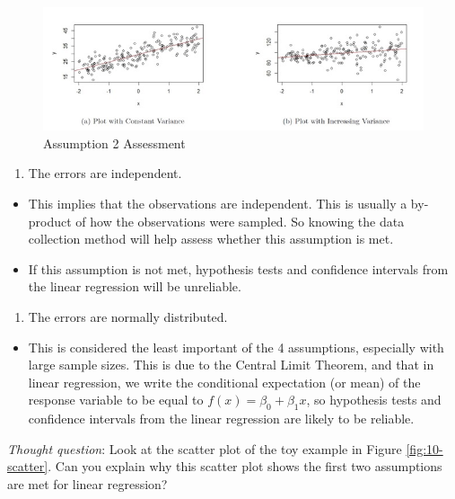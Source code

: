 \documentclass[
]{book}
\providecommand{\tightlist}{%
  \setlength{\itemsep}{0pt}\setlength{\parskip}{0pt}}
\begin{document}
\begin{figure}
\centering
\includegraphics{images/10-ass2.jpg}
\caption{\label{fig:10-ass2}Assumption 2 Assessment}
\end{figure}

\begin{enumerate}
\def\labelenumi{\arabic{enumi}.}
\setcounter{enumi}{2}
\tightlist
\item
  The errors are independent.
\end{enumerate}

\begin{itemize}
\tightlist
\item
  This implies that the observations are independent. This is usually a by-product of how the observations were sampled. So knowing the data collection method will help assess whether this assumption is met.
\item
  If this assumption is not met, hypothesis tests and confidence intervals from the linear regression will be unreliable.
\end{itemize}

\begin{enumerate}
\def\labelenumi{\arabic{enumi}.}
\setcounter{enumi}{3}
\tightlist
\item
  The errors are normally distributed.
\end{enumerate}

\begin{itemize}
\tightlist
\item
  This is considered the least important of the 4 assumptions, especially with large sample sizes. This is due to the Central Limit Theorem, and that in linear regression, we write the conditional expectation (or mean) of the response variable to be equal to \(f(x) = \beta_0 + \beta_1 x\), so hypothesis tests and confidence intervals from the linear regression are likely to be reliable.
\end{itemize}

\emph{Thought question}: Look at the scatter plot of the toy example in Figure \ref{fig:10-scatter}. Can you explain why this scatter plot shows the first two assumptions are met for linear regression?
\end{document}
